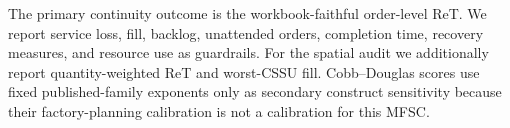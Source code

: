 The primary continuity outcome is the workbook-faithful order-level ReT. We report service
loss, fill, backlog, unattended orders, completion time, recovery measures, and resource use as
guardrails. For the spatial audit we additionally report quantity-weighted ReT and worst-CSSU
fill. Cobb--Douglas scores use fixed published-family exponents only as secondary construct
sensitivity because their factory-planning calibration is not a calibration for this MFSC.

